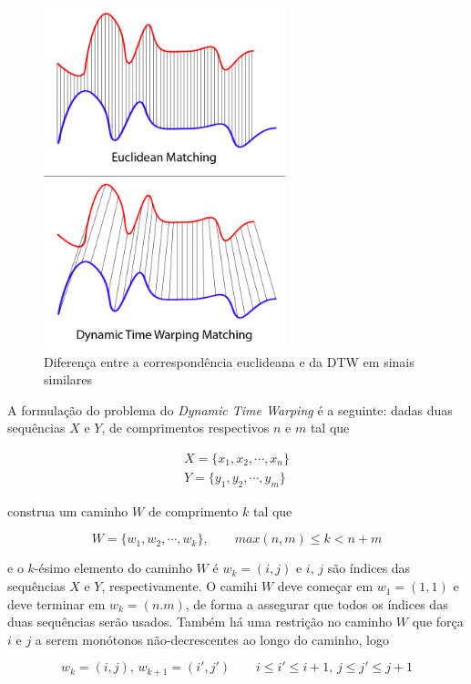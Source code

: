 \begin{figure}[htb]
\centering
\includegraphics[width=7cm]{figuras/Euclidean_vs_DTW.jpg}
\caption{Diferença entre a correspondência euclideana e da DTW em sinais similares \citep{dtwmatching}}
\label{fig:euclidean-vs-dtw-matching}
\end{figure}

A formulação do problema \citep{salvador2007toward} do \textit{Dynamic Time Warping} é a seguinte: dadas duas sequências $X$ e $Y$, de comprimentos respectivos $n$ e $m$ tal que 

\begin{align*}
    X = \{x_1, x_2, \cdots, x_n\} \\
    Y = \{y_1, y_2, \cdots, y_m\}
\end{align*}

construa um caminho $W$ de comprimento $k$ tal que

\begin{equation*}
    W = \{w_1, w_2, \cdots, w_k\}, \qquad max(n, m) \leq k < n + m
\end{equation*}

e o $k$-ésimo elemento do caminho $W$ é $w_k = (i, j)$ e $i$, $j$ são índices das sequências $X$ e $Y$, respectivamente. O camihi $W$ deve começar em $w_1 = (1, 1)$ e deve terminar em $w_k = (n. m)$, de forma a assegurar que todos os índices das duas sequências serão usados. Também há uma restrição no caminho $W$ que força $i$ e $j$ a serem monótonos não-decrescentes ao longo do caminho, logo

\begin{equation*}
    w_k = (i, j),\, w_{k + 1} = (i', j') \qquad i \leq i' \leq i + 1,\, j\leq j' \leq j + 1
\end{equation*}

